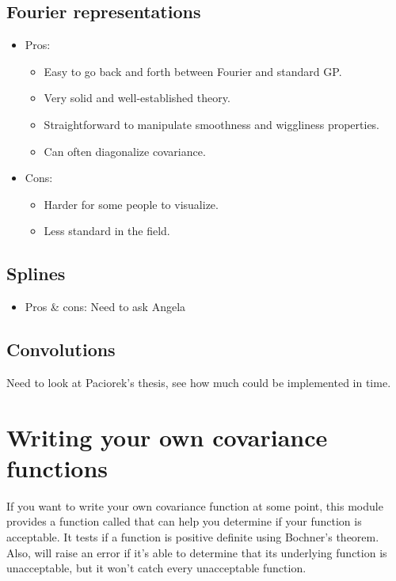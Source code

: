 \documentclass{manual}
\begin{document}
\subsection{Fourier representations}\label{sub:fourier}
\begin{itemize}
	\item Pros:
	\begin{itemize}
		\item Easy to go back and forth between Fourier and standard GP.
		\item Very solid and well-established theory.
		\item Straightforward to manipulate smoothness and wiggliness properties.
		\item Can often diagonalize covariance.
	\end{itemize}
	\item Cons:
	\begin{itemize}
		\item Harder for some people to visualize.
		\item Less standard in the field.
	\end{itemize}
\end{itemize}

\subsection{Splines}\label{sub:splines}
\begin{itemize}
	\item Pros \& cons: Need to ask Angela
\end{itemize}

\subsection{Convolutions}\label{sub:convolutions}
Need to look at Paciorek's thesis, see how much could be implemented in time.


\section{Writing your own covariance functions}\label{sec:usercov} %
If you want to write your own covariance function at some point, this module provides a function called  that can help you determine if your function is acceptable. It tests if a function is positive definite using Bochner's theorem. Also,  will raise an error if it's able to determine that its underlying function is unacceptable, but it won't catch every unacceptable function. 
\end{document}
